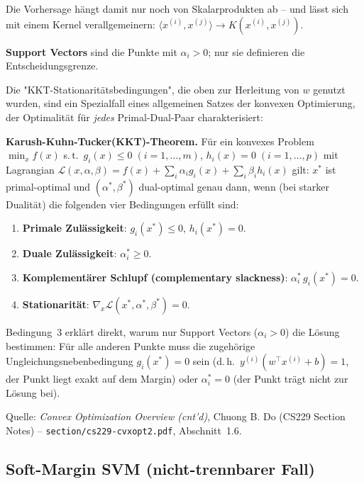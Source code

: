 \documentclass[11pt]{article}
\theoremstyle{csthm}
\theoremstyle{csdef}
\newcommand{\T}{^\top}
\begin{document}
Die Vorhersage hängt damit nur noch von Skalarprodukten ab -- und lässt sich
mit einem Kernel verallgemeinern: $\langle x^{(i)}, x^{(j)}\rangle \to K(x^{(i)}, x^{(j)})$.

\textbf{Support Vectors} sind die Punkte mit $\alpha_i > 0$; nur sie
definieren die Entscheidungsgrenze.

Die "KKT-Stationaritätsbedingungen", die oben zur Herleitung von $w$ genutzt
wurden, sind ein Spezialfall eines allgemeinen Satzes der konvexen
Optimierung, der Optimalität für \emph{jedes} Primal-Dual-Paar
charakterisiert:

\begin{tcolorbox}[thmstyle]
\textbf{Karush-Kuhn-Tucker(KKT)-Theorem.} Für ein konvexes Problem
$\min_x f(x)$ s.\,t.\ $g_i(x)\leq 0\;(i=1,\ldots,m)$, $h_i(x)=0\;(i=1,\ldots,p)$
mit Lagrangian $\mathcal L(x,\alpha,\beta) = f(x) + \sum_i \alpha_i g_i(x) +
\sum_i \beta_i h_i(x)$ gilt: $x^*$ ist primal-optimal und $(\alpha^*,\beta^*)$
dual-optimal genau dann, wenn (bei starker Dualität) die folgenden vier
Bedingungen erfüllt sind:
\begin{enumerate}[leftmargin=*, itemsep=1pt]
  \item \textbf{Primale Zulässigkeit}: $g_i(x^*)\leq 0$, $h_i(x^*)=0$.
  \item \textbf{Duale Zulässigkeit}: $\alpha_i^* \geq 0$.
  \item \textbf{Komplementärer Schlupf (complementary slackness)}: $\alpha_i^*\,g_i(x^*)=0$.
  \item \textbf{Stationarität}: $\nabla_x \mathcal L(x^*,\alpha^*,\beta^*)=0$.
\end{enumerate}
\end{tcolorbox}

Bedingung~3 erklärt direkt, warum nur Support Vectors ($\alpha_i>0$) die
Lösung bestimmen: Für alle anderen Punkte muss die zugehörige
Ungleichungsnebenbedingung $g_i(x^*)=0$ sein (d.\,h.\ $y^{(i)}(w\T x^{(i)}+b)=1$,
der Punkt liegt exakt auf dem Margin) oder $\alpha_i^*=0$ (der Punkt trägt
nicht zur Lösung bei).

\begin{tcolorbox}[srcstyle]
Quelle: \emph{Convex Optimization Overview (cnt'd)}, Chuong B. Do (CS229
Section Notes) -- \texttt{section/cs229-cvxopt2.pdf}, Abschnitt~1.6.
\end{tcolorbox}

\subsection{Soft-Margin SVM (nicht-trennbarer Fall)}
\end{document}
